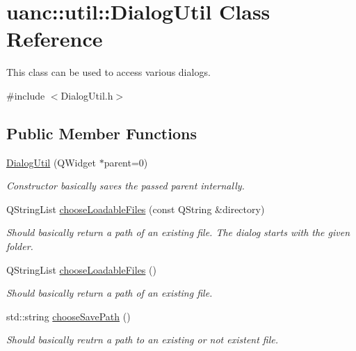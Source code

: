\hypertarget{classuanc_1_1util_1_1_dialog_util}{}\section{uanc\+:\+:util\+:\+:Dialog\+Util Class Reference}
\label{classuanc_1_1util_1_1_dialog_util}


This class can be used to access various dialogs.  




{\ttfamily \#include $<$Dialog\+Util.\+h$>$}

\subsection*{Public Member Functions}
\begin{DoxyCompactItemize}
\item 
\hyperlink{classuanc_1_1util_1_1_dialog_util_a1d190a4acd4808a578ddcd3d9db20b73}{Dialog\+Util} (Q\+Widget $\ast$parent=0)
\begin{DoxyCompactList}\small\item\em Constructor basically saves the passed parent internally. \end{DoxyCompactList}\item 
Q\+String\+List \hyperlink{classuanc_1_1util_1_1_dialog_util_aaebf5202357b611c68bc7149b4dc5639}{choose\+Loadable\+Files} (const Q\+String \&directory)
\begin{DoxyCompactList}\small\item\em Should basically return a path of an existing file. The dialog starts with the given folder. \end{DoxyCompactList}\item 
Q\+String\+List \hyperlink{classuanc_1_1util_1_1_dialog_util_a7ed1e54433f3812a22c1c76e241420cb}{choose\+Loadable\+Files} ()
\begin{DoxyCompactList}\small\item\em Should basically return a path of an existing file. \end{DoxyCompactList}\item 
std\+::string \hyperlink{classuanc_1_1util_1_1_dialog_util_a4e6c388c66bf96c980a96e87e53d9cdd}{choose\+Save\+Path} ()
\begin{DoxyCompactList}\small\item\em Should basically reutrn a path to an existing or not existent file. \end{DoxyCompactList}\end{DoxyCompactItemize}


